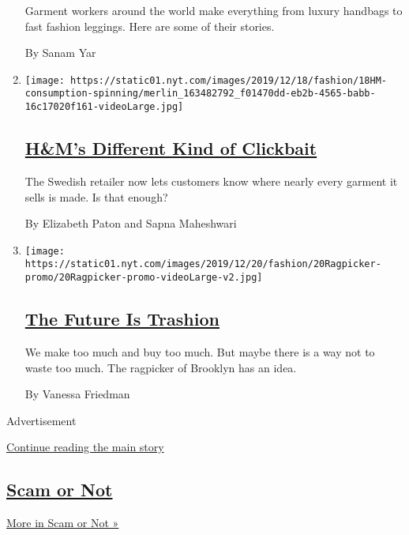 \begin{enumerate}
  Garment workers around the world make everything from luxury handbags
  to fast fashion leggings. Here are some of their stories.

  By Sanam Yar
\item
  \texttt{[image: https://static01.nyt.com/images/2019/12/18/fashion/18HM-consumption-spinning/merlin\_163482792\_f01470dd-eb2b-4565-babb-16c17020f161-videoLarge.jpg]}

  \hypertarget{hms-different-kind-of-clickbait}{%
  \subsection{\texorpdfstring{\href{/2019/12/18/fashion/hms-supply-chain-transparency.html}{H\&M's
  Different Kind of
  Clickbait}}{H\&M's Different Kind of Clickbait}}\label{hms-different-kind-of-clickbait}}

  The Swedish retailer now lets customers know where nearly every
  garment it sells is made. Is that enough?

  By Elizabeth Paton and Sapna Maheshwari
\item
  \texttt{[image: https://static01.nyt.com/images/2019/12/20/fashion/20Ragpicker-promo/20Ragpicker-promo-videoLarge-v2.jpg]}

  \hypertarget{the-future-is-trashion}{%
  \subsection{\texorpdfstring{\href{/2019/12/20/style/zero-waste-daniel-trashion.html}{The
  Future Is
  Trashion}}{The Future Is Trashion}}\label{the-future-is-trashion}}

  We make too much and buy too much. But maybe there is a way not to
  waste too much. The ragpicker of Brooklyn has an idea.

  By Vanessa Friedman
\end{enumerate}

Advertisement

\protect\hyperlink{after-mid5}{Continue reading the main story}

\hypertarget{scam-or-not}{%
\subsection{\texorpdfstring{\href{/column/scam-or-not}{Scam or
Not}}{Scam or Not}}\label{scam-or-not}}

\href{/column/scam-or-not}{More in Scam or Not »}

